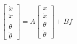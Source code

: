 \documentclass{article}
\begin{document}
\thispagestyle{empty}
\newcommand{\sign}{\text{sign}}

$$
\begin{bmatrix}\dot{x}\\\ddot{x}\\\dot{\theta}\\\ddot{\theta}\end{bmatrix} = 
A
\begin{bmatrix}{x}\\\dot{x}\\{\theta}\\\dot{\theta}\end{bmatrix}  +
B f
$$
\end{document}
